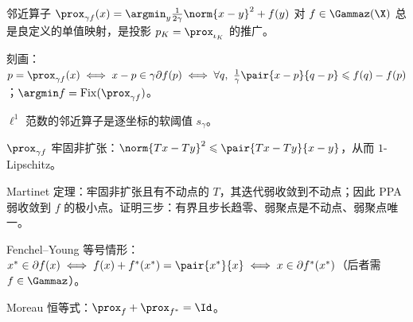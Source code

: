 \begin{keypoints}
  \item 邻近算子 $\prox_{\gamma f}(x)=\argmin_y\frac1{2\gamma}\norm{x-y}^2+f(y)$ 对 $f\in\Gammaz(\X)$ 总是良定义的单值映射，是投影 $p_K=\prox_{\iota_K}$ 的推广。
  \item 刻画：$p=\prox_{\gamma f}(x)\iff x-p\in\gamma\partial f(p)\iff\forall q,\ \frac1\gamma\pair{x-p}{q-p}\leqslant f(q)-f(p)$；$\argmin f=\Fix(\prox_{\gamma f})$。
  \item $\ell^1$ 范数的邻近算子是逐坐标的软阈值 $s_\gamma$。
  \item $\prox_{\gamma f}$ 牢固非扩张：$\norm{Tx-Ty}^2\leqslant\pair{Tx-Ty}{x-y}$，从而 $1$-Lipschitz。
  \item Martinet 定理：牢固非扩张且有不动点的 $T$，其迭代弱收敛到不动点；因此 PPA 弱收敛到 $f$ 的极小点。证明三步：有界且步长趋零、弱聚点是不动点、弱聚点唯一。
  \item Fenchel--Young 等号情形：$x^*\in\partial f(x)\iff f(x)+f^*(x^*)=\pair{x^*}{x}\iff x\in\partial f^*(x^*)$（后者需 $f\in\Gammaz$）。
  \item Moreau 恒等式：$\prox_f+\prox_{f^*}=\Id$。
\end{keypoints}
